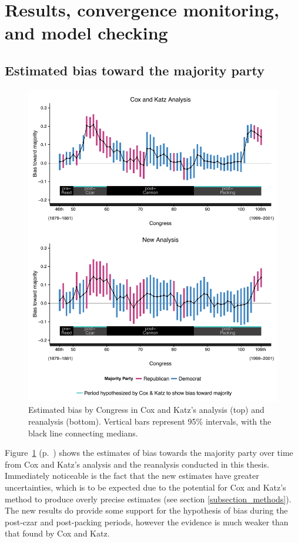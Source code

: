 \section{Results, convergence monitoring, and model checking}


\subsection{Estimated bias toward the majority party}
\label{results}

\begin{figure}
\centering
\includegraphics[scale=0.75]{sections/figs/ck_replication}
\caption{Estimated bias by Congress in Cox and Katz's analysis (top) and reanalysis (bottom). Vertical bars represent 95\%  intervals, with the black line connecting medians.}
\label{fig:ck_bias}
\end{figure}

Figure~\ref{fig:ck_bias} (p.~\pageref{fig:ck_bias}) shows the estimates of bias towards the majority party over time from Cox and Katz's analysis and the reanalysis conducted in this thesis. Immediately noticeable is the fact that the new estimates have greater uncertainties, which is to be expected due to the potential for Cox and Katz's method to produce overly precise estimates  (see section \ref{subsection_methods}). The new results do provide some support for the hypothesis of bias during the post-czar and post-packing periods, however the evidence is much weaker than that found by Cox and Katz. 

